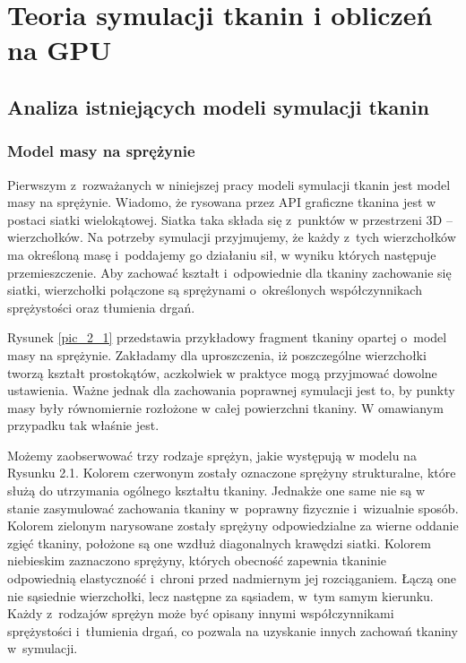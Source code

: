 \chapter{Teoria symulacji tkanin i obliczeń na GPU}
\label{t:teoria}


	\section{Analiza istniejących modeli symulacji tkanin}
	\label{t:teoria:analiza}
	
		\subsection{Model masy na sprężynie}
		\label{t:teoria:analiza:masa}		
			
			Pierwszym z~rozważanych w niniejszej pracy modeli symulacji tkanin jest model masy na sprężynie. Wiadomo, że rysowana przez API graficzne tkanina jest w postaci siatki wielokątowej. Siatka taka składa się z~punktów w przestrzeni 3D -- wierzchołków. Na potrzeby symulacji przyjmujemy, że każdy z~tych wierzchołków ma określoną masę i~poddajemy go działaniu sił, w wyniku których następuje przemieszczenie. Aby zachować kształt i~odpowiednie dla tkaniny zachowanie się siatki, wierzchołki połączone są sprężynami o~określonych współczynnikach sprężystości oraz tłumienia drgań. 
			
			
			
			
			Rysunek \ref{pic_2_1} przedstawia przykładowy fragment tkaniny opartej o~model masy na sprężynie. Zakładamy dla uproszczenia, iż poszczególne wierzchołki tworzą kształt prostokątów, aczkolwiek w praktyce mogą przyjmować dowolne ustawienia. Ważne jednak dla zachowania poprawnej symulacji jest to, by punkty masy były równomiernie rozłożone w całej powierzchni tkaniny. W omawianym przypadku tak właśnie jest. 
			
			Możemy zaobserwować trzy rodzaje sprężyn, jakie występują w modelu na Rysunku 2.1. Kolorem czerwonym zostały oznaczone sprężyny strukturalne, które służą do utrzymania ogólnego kształtu tkaniny. Jednakże one same nie są w stanie zasymulować zachowania tkaniny w~poprawny fizycznie i~wizualnie sposób. Kolorem zielonym narysowane zostały sprężyny odpowiedzialne za wierne oddanie zgięć tkaniny, położone są one wzdłuż diagonalnych krawędzi siatki. Kolorem niebieskim zaznaczono sprężyny, których obecność zapewnia tkaninie odpowiednią elastyczność i~chroni przed nadmiernym jej rozciąganiem. Łączą one nie sąsiednie wierzchołki, lecz następne za sąsiadem, w~tym samym kierunku. Każdy z~rodzajów sprężyn może być opisany innymi współczynnikami sprężystości i~tłumienia drgań, co pozwala na uzyskanie innych zachowań tkaniny w~symulacji.
			
